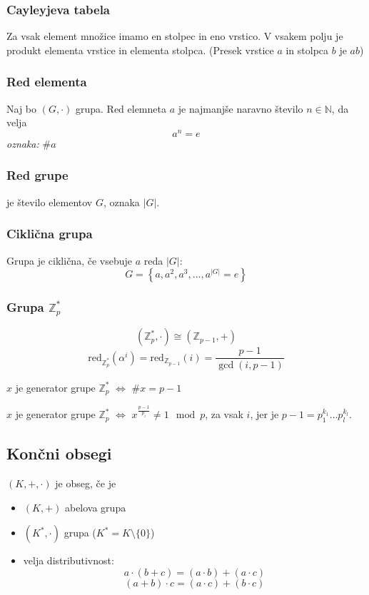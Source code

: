 \begin{multicols}{5}
\subsubsection{Cayleyjeva tabela}
Za vsak element množice imamo en stolpec in eno vrstico. V vsakem polju je produkt elementa vrstice in elementa stolpca.
(Presek vrstice $a$ in stolpca $b$ je $ab$)

\subsubsection{Red elementa}
Naj bo $(G,\cdot)$ grupa. Red elemneta $a$ je najmanjše naravno število $n \in \mathbb{N}$, da velja
\[a^n = e\]
\textit{oznaka:} $\#a$

\subsubsection{Red grupe}
je število elementov $G$, oznaka $|G|$.

\subsubsection*{Ciklična grupa}
Grupa je ciklična, če vsebuje $a$ reda $|G|$:
\[ G = \left\{ a, a^2, a^3, \dots, a^{|G|} = e\right\}\]

\subsubsection*{Grupa $\mathbb{Z}_p^*$}
\[ ( \mathbb{Z}_p^*, \cdot ) \cong (\mathbb{Z}_{p-1}, +)\]
\[ \text{red}_{\mathbb{Z}_p^*}(\alpha^i) = \text{red}_{\mathbb{Z}_{p-1}}(i) = \frac{p-1}{\gcd(i, p-1)}\]

$x$ je generator grupe $\mathbb{Z}^*_p$ $\iff$ $\# x = p - 1$

$x$ je generator grupe $\mathbb{Z}^*_p$ $\iff$ $x^{\frac{p-1}{p_i}} \neq 1 \mod p$, za vsak $i$, jer je $p-1 = p_1^{k_1} \dots p_l^{k_l}$.

\subsection*{Končni obsegi}
$(K, +,\cdot)$ je obseg, če je
\begin{itemize}
	\item $(K, +)$ abelova grupa
	\item $(K^*, \cdot)$ grupa ($K^* = K \setminus \{0\}$)
	\item velja distributivnost:
	\[ a \cdot (b+c) = (a\cdot b) + (a \cdot c)\]
	\[ (a+b) \cdot c = (a\cdot c) + (b \cdot c)\]
\end{itemize}


\end{multicols}

